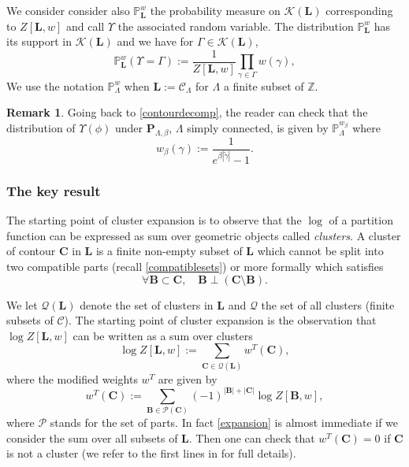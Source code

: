 \documentclass[10pt]{amsart}
\let\mathcal\mathscr
\numberwithin{equation}{section}
\theoremstyle{plain}
\theoremstyle{definition}
\newtheorem{rem}[theorem]{Remark}
\newcommand{\cQ}{{\ensuremath{\mathcal Q}} }
\newcommand{\cP}{{\ensuremath{\mathcal P}} }
\newcommand{\cC}{{\ensuremath{\mathcal C}} }
\newcommand{\cK}{{\ensuremath{\mathcal K}} }
\newcommand{\bP}{{\ensuremath{\mathbf P}} }
\newcommand{\bC}{{\ensuremath{\mathbf C}} }
\newcommand{\bL}{{\ensuremath{\mathbf L}} }
\newcommand{\bB}{{\ensuremath{\mathbf B}} }
\newcommand{\bbP}{{\ensuremath{\mathbb P}} }
\newcommand{\bbZ}{{\ensuremath{\mathbb Z}} }
\newcommand{\gb}{\beta}
\newcommand{\gG}{\Gamma}
\newcommand{\gL}{\Lambda}
\begin{document}
We consider consider also $\bbP^w_{\bL}$ the probability measure on $\cK(\bL)$ corresponding to $Z[\bL,w]$ and call $\Upsilon$ the associated random variable.
The distribution $\bbP^w_{\bL}$ has its support in $\cK(\bL)$ and we have for $\gG\in \cK(\bL)$,
\begin{equation*}%
\bbP^w_{\bL}(\Upsilon=\gG):=\frac{1}{Z[\bL,w]}\prod_{\gamma\in \gG}w(\gamma),
\end{equation*}
We use the notation $\bbP^w_{\gL}$ when $\bL:=\cC_{\gL}$ for $\gL$ a finite subset of $\bbZ$.

\begin{rem}\label{teorema}
Going back to \eqref{contourdecomp}, the reader can check that the distribution of $\Upsilon(\phi)$ under
$\bP_{\gL,\gb}$, $\gL$ simply connected, is given by $\bbP^{w_{\gb}}_\gL$ where
\begin{equation}\label{specialweight}
w_{\gb}(\gamma):=\frac{1}{e^{\gb|\tilde \gamma|}-1}.
\end{equation}
\end{rem}
\subsubsection{The key result}

The starting point of cluster expansion is to observe that the $\log$ of a partition function
can be expressed as sum over geometric objects called \textit{clusters}.
A cluster of contour $\bC$ in $\bL$ is a finite non-empty subset of $\bL$ which cannot be split into two compatible parts (recall \eqref{compatiblesets})
or more formally which satisfies
\begin{equation}\label{noncluster}
\forall \bB \subset \bC, \quad \bB \perp (\bC \setminus \bB).
\end{equation}

We let $\cQ(\bL)$ denote the set of clusters in $\bL$ and $\cQ$ the set of all clusters (finite subsets of $\cC$).
The starting point of cluster expansion is the observation that $\log Z[\bL,w]$ can be written as a sum over clusters
\begin{equation}\label{expansion}
\log Z[\bL,w]:= \sum_{\bC \in \cQ(\bL)} w^T(\bC),
\end{equation}
where the modified weights $w^T$ are given by
\begin{equation*}%
w^T(\bC):= \sum_{\bB\in \cP(\bC)} (-1)^{|\bB|+|\bC|} \log Z[\bB,w],
\end{equation*}
where $\cP$ stands for the set of parts. In fact \eqref{expansion} is almost immediate if we consider the sum over all subsets of $\bL$. Then
one can check that $w^T(\bC)=0$ if $\bC$ is not a cluster (we refer to the first lines in \cite[\S 3]{cf:KP} for full details).
\end{document}
